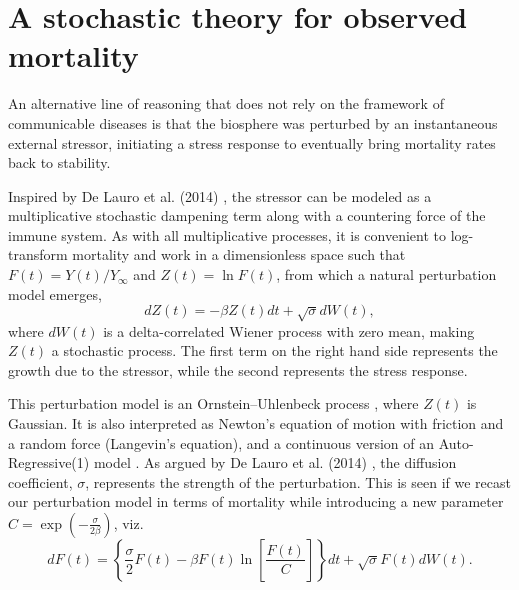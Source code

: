\documentclass{article}
\begin{document}
\section*{A stochastic theory for observed mortality}
\label{seq:alt}
An alternative line of reasoning that does not rely on the framework of communicable diseases is that the biosphere was perturbed by an instantaneous external stressor, initiating a stress response to eventually bring mortality rates back to stability.

Inspired by De Lauro et al. (2014) \cite{de2014stochastic}, the stressor can be modeled as a multiplicative stochastic dampening term along with a countering force of the immune system. 
As with all multiplicative processes, it is convenient to log-transform mortality and work in a dimensionless space such that $F(t)=Y(t)/Y_\infty$ and $Z(t)=\ln{F}(t)$, from which a natural perturbation model emerges,
\begin{equation}
\label{eq:microscopic}
dZ(t)= -\beta Z(t) dt + \sqrt{\sigma}dW(t),
\end{equation}
where $dW(t)$ is a delta-correlated Wiener process with zero mean, making $Z(t)$ a stochastic process. The first term on the right hand side represents the growth due to the stressor, while the second represents the stress response.  

This perturbation model is an Ornstein–Uhlenbeck process \cite{risken1996fokker}, where $Z(t)$ is Gaussian. It is also interpreted as Newton's equation of motion with friction and a random force (Langevin's equation), and a continuous version of an Auto-Regressive(1) model \cite{akaike1970statistical}. As argued by De Lauro et al. (2014) \cite{de2014stochastic}, the diffusion coefficient, $\sigma$, represents the strength of the perturbation. This is seen if we recast our perturbation model in terms of mortality while introducing a new parameter $C=\exp{(-\frac{\sigma}{2\beta})}$, viz. 
\begin{equation}
\label{eq:microscopicOriginal}
dF(t) = \left\{\frac{\sigma}{2}F(t) - \beta F(t)\ln\left[\frac{F(t)}{C}\right]\right\}dt + \sqrt{\sigma}F(t)dW(t).
\end{equation}
\end{document}
